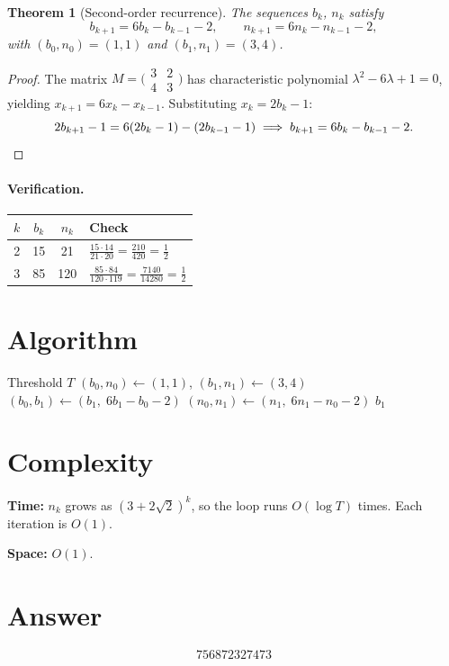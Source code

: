 \documentclass[12pt]{article}
\newtheorem{theorem}{Theorem}
\begin{document}
\begin{theorem}[Second-order recurrence]
\label{thm:bn}
The sequences $b_k$, $n_k$ satisfy
\[
b_{k+1} = 6b_k - b_{k-1} - 2, \qquad n_{k+1} = 6n_k - n_{k-1} - 2,
\]
with $(b_0, n_0) = (1,1)$ and $(b_1, n_1) = (3, 4)$.
\end{theorem}
\begin{proof}
The matrix $M = \bigl(\begin{smallmatrix} 3 & 2 \\ 4 & 3 \end{smallmatrix}\bigr)$ has characteristic polynomial $\lambda^2 - 6\lambda + 1 = 0$, yielding $x_{k+1} = 6x_k - x_{k-1}$. Substituting $x_k = 2b_k - 1$:
\[
2b_{k+1} - 1 = 6(2b_k - 1) - (2b_{k-1} - 1) \implies b_{k+1} = 6b_k - b_{k-1} - 2. \qedhere
\]
\end{proof}

\paragraph{Verification.}
\begin{center}
\begin{tabular}{|c|c|c|l|}
\hline
$k$ & $b_k$ & $n_k$ & Check \\
\hline
2 & 15 & 21 & $\frac{15 \cdot 14}{21 \cdot 20} = \frac{210}{420} = \frac{1}{2}$ \\
3 & 85 & 120 & $\frac{85 \cdot 84}{120 \cdot 119} = \frac{7140}{14280} = \frac{1}{2}$ \\
\hline
\end{tabular}
\end{center}

\section{Algorithm}

\begin{algorithm}[H]
\caption{Find $b$ for first $n > T$}
\begin{algorithmic}[1]
\REQUIRE Threshold $T$
\STATE $(b_0, n_0) \gets (1, 1)$, $(b_1, n_1) \gets (3, 4)$
    \STATE $(b_0, b_1) \gets (b_1,\; 6b_1 - b_0 - 2)$
    \STATE $(n_0, n_1) \gets (n_1,\; 6n_1 - n_0 - 2)$
\ENDWHILE
\RETURN $b_1$
\end{algorithmic}
\end{algorithm}

\section{Complexity}

\textbf{Time:} $n_k$ grows as $(3 + 2\sqrt{2})^k$, so the loop runs $O(\log T)$ times. Each iteration is $O(1)$.

\textbf{Space:} $O(1)$.

\section{Answer}

\[
\boxed{756872327473}
\]
\end{document}
